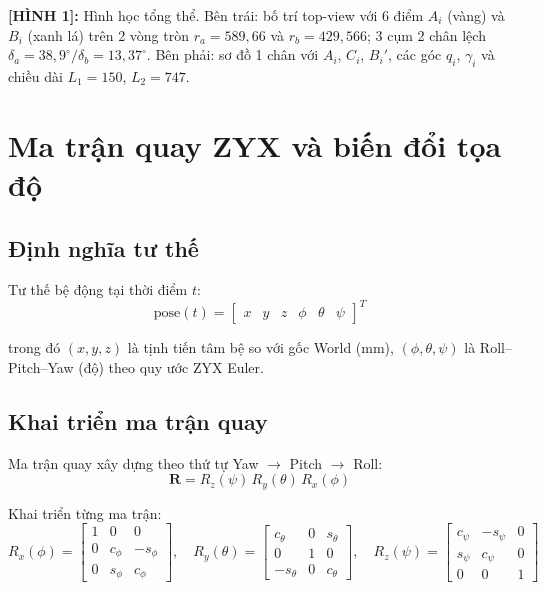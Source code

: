 \documentclass[12pt,a4paper]{article}
\newcommand{\figref}[2]{%
  \begin{mdframed}[
    linecolor=blue!50, linewidth=1pt,
    backgroundcolor=blue!3,
    innerleftmargin=6pt, innerrightmargin=6pt,
    innertopmargin=4pt, innerbottommargin=4pt
  ]
  {\small\bfseries [H\`{I}NH #1]:} {\small #2}
  \end{mdframed}
}
\newcommand{\R}{\mathbf{R}}
\begin{document}
\figref{1}{Hình học tổng thể. Bên trái: bố trí top-view với 6 điểm $A_i$ (vàng) và
$B_i$ (xanh lá) trên 2 vòng tròn $r_a=589{,}66$ và $r_b=429{,}566$; 3 cụm 2 chân
lệch $\delta_a=38{,}9^{\circ}/\delta_b=13{,}37^{\circ}$. Bên phải: sơ đồ 1 chân với $A_i$, $C_i$,
$B_i'$, các góc $q_i$, $\gamma_i$ và chiều dài $L_1=150$, $L_2=747$.}

\section{Ma trận quay ZYX và biến đổi tọa độ}

\subsection{Định nghĩa tư thế}

Tư thế bệ động tại thời điểm $t$:
\begin{equation}
  \text{pose}(t) = \begin{bmatrix} x & y & z & \phi & \theta & \psi \end{bmatrix}^T
  \label{eq:pose}
\end{equation}

trong đó $(x{,}y{,}z)$ là tịnh tiến tâm bệ so với gốc World (mm),
$(\phi{,}\theta{,}\psi)$ là Roll--Pitch--Yaw (độ) theo quy ước ZYX Euler.

\subsection{Khai triển ma trận quay}

Ma trận quay xây dựng theo thứ tự Yaw $\to$ Pitch $\to$ Roll:
\begin{equation}
  \R = R_z(\psi)\,R_y(\theta)\,R_x(\phi)
  \label{eq:R_def}
\end{equation}

Khai triển từng ma trận:
\begin{equation}
  R_x(\phi) = \begin{bmatrix}1&0&0\\0&c_\phi&-s_\phi\\0&s_\phi&c_\phi\end{bmatrix},\quad
  R_y(\theta) = \begin{bmatrix}c_\theta&0&s_\theta\\0&1&0\\-s_\theta&0&c_\theta\end{bmatrix},\quad
  R_z(\psi) = \begin{bmatrix}c_\psi&-s_\psi&0\\s_\psi&c_\psi&0\\0&0&1\end{bmatrix}
\end{equation}
\end{document}
